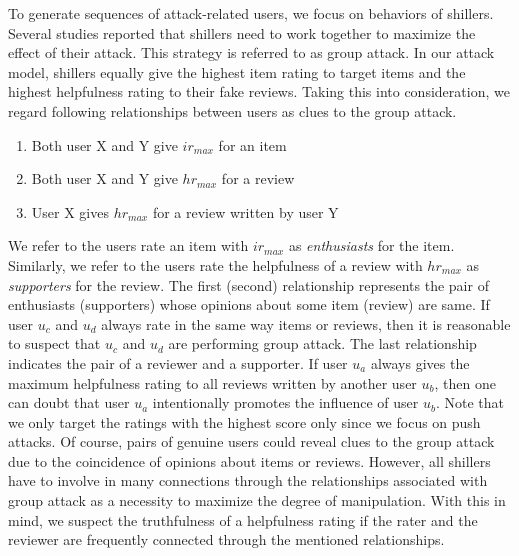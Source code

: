 \documentclass[master,english,final]{kaist-ucs}
\begin{document}
To generate sequences of attack-related users, we focus on behaviors of shillers.
Several studies \cite{LiesAndPropaganda,UnsupervisedShilling} reported that shillers need to work together to maximize the effect of their attack.
This strategy is referred to as group attack.
In our attack model, shillers equally give the highest item rating to target items and the highest helpfulness rating to their fake reviews.
Taking this into consideration, we regard following relationships between users as clues to the group attack.
\begin{enumerate}
\item Both user X and Y give $ir_{max}$ for an item
\item Both user X and Y give $hr_{max}$ for a review
\item User X gives $hr_{max}$ for a review written by user Y
\end{enumerate}
We refer to the users rate an item with $ir_{max}$ as \textit{enthusiasts} for the item.
Similarly, we refer to the users rate the helpfulness of a review with $hr_{max}$ as \textit{supporters} for the review.
The first (second) relationship represents the pair of enthusiasts (supporters) whose opinions about some item (review) are same.
If user $u_c$ and $u_d$ always rate in the same way items or reviews, then it is reasonable to suspect that $u_c$ and $u_d$ are performing group attack.
The last relationship indicates the pair of a reviewer and a supporter.
If user $u_a$ always gives the maximum helpfulness rating to all reviews written by another user $u_b$, then one can doubt that user $u_a$ intentionally promotes the influence of user $u_b$.
Note that we only target the ratings with the highest score only since we focus on push attacks.
Of course, pairs of genuine users could reveal clues to the group attack due to the coincidence of opinions about items or reviews.
However, all shillers have to involve in many connections through the relationships associated with group attack as a necessity to maximize the degree of manipulation.
With this in mind, we suspect the truthfulness of a helpfulness rating if the rater and the reviewer are frequently connected through the mentioned relationships.
\end{document}
